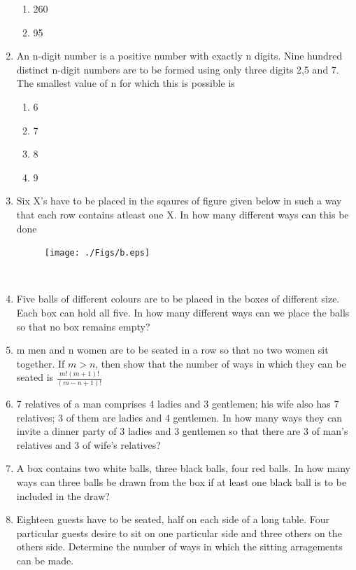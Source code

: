 \documentclass[journal,12pt,twocolumn]{IEEEtran}
\begin{document}
\begin{enumerate}
\begin{enumerate}
\item 260
\item 95\\
\end{enumerate}
\item An n-digit number is a positive number with exactly n digits. Nine hundred distinct n-digit numbers are to be formed using only three digits 2,5 and 7. The smallest value of n for which this is possible is
\begin{enumerate}
\item 6
\item 7
\item 8
\item 9\\
\end{enumerate}
\item Six X's have to be placed in the sqaures of figure given below in such a way that each row contains atleast one X. In how many different ways can this be done
\begin{figure}
	\texttt{[image: ./Figs/b.eps]} 
\end{figure}\\
\item Five balls of different colours are to be placed in the boxes of different size. Each box can hold all five. In how many different ways can we place the balls so that no box remains empty?\\
\item m men and n women are to be seated in a row so that no two women sit together. If $m>n$, then show that the number of ways in which they can be seated is $\frac{m!(m+1)!}{(m-n+1)!}$\\
\item 7 relatives of a man comprises 4 ladies and 3 gentlemen; his wife also has 7 relatives; 3 of them are ladies and 4 gentlemen. In how many ways they can invite a dinner party of 3 ladies and 3 gentlemen so that there are 3 of man's relatives and 3 of wife's relatives?\\
\item A box contains two white balls, three black balls, four red balls. In how many ways can three balls be drawn from the box if at least one black ball is to be included in the draw?\\
\item Eighteen guests have to be seated, half on each side of a long table. Four particular guests desire to sit on one particular side and three others on the others side. Determine the number of ways in which the sitting arragements can be made.\\

\end{enumerate}
\end{document}
